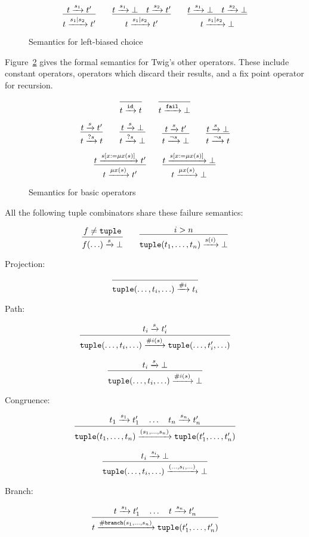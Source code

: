 \begin{figure}[h]
\label{semantics:choice}
\[
\infer{t \arr{s_1|s_2} t'}{t \arr{s_1} t'}
\qquad 
\infer{t \arr{s_1|s_2} t'}{t \arr{s_1} \bot \quad t \arr{s_2} t'}
\qquad
\infer{t \arr{s_1|s_2} \bot}{t \arr{s_1} \bot \quad t \arr{s_2} \bot}
\]
\caption{Semantics for left-biased choice}
\end{figure}

Figure~\ref{semantics:basic} gives the formal semantics for Twig's other
operators. These include constant operators, operators which discard their
results, and a fix point operator for recursion.

\begin{figure}[h]
\label{semantics:basic}
\[
\infer{t \arr{\mathtt{id}} t}{}
\qquad
\infer{t \arr{\mathtt{fail}} \bot}{}
\]

\[
\infer{t \arr{?s} t}{t \arr{s} t'}
\qquad 
\infer{t \arr{?s} \bot}{t \arr{s} \bot}
\qquad
\infer{t \arr{\lnot s} \bot}{t \arr{s} t'}
\qquad 
\infer{t \arr{\lnot s} t}{t \arr{s} \bot}
\]

\[
\infer{t \arr{\mu x(s)} t'}{t \arr{s[x := \mu x(s)]} t'}
\qquad 
\infer{t \arr{\mu x(s)} \bot}{t \arr{s[x := \mu x(s)]} \bot}
\]
\caption{Semantics for basic operators}
\end{figure}

All the following tuple combinators share these failure semantics:

\[
\infer{f(\ldots) \arr{s} \bot}
{f \neq \mathtt{tuple}}
\qquad
\infer{\mathtt{tuple}(t_1,\ldots,t_n) \arr{s(i)} \bot}{i > n}
\]

Projection:

\[
\infer{\mathtt{tuple}(\ldots,t_i,\ldots) \arr{\#i} t_i}{}
\]

Path:

\[
\infer{\mathtt{tuple}(\ldots,t_i,\ldots) \arr{\#i(s)} 
\mathtt{tuple}(\ldots,t_i',\ldots)}
{t_i \arr{s} t_i'}
\]

\[
\infer{\mathtt{tuple}(\ldots,t_i,\ldots) \arr{\#i(s)} \bot}
{t_i \arr{s} \bot}
\]

Congruence:

\[
\infer{
\mathtt{tuple}(t_1,\ldots,t_n)
\arr{(s_1,\ldots,s_n)}
\mathtt{tuple}(t_1',\ldots,t_n') }
{t_1 \arr{s_1} t_1' \quad \ldots \quad t_n \arr{s_n} t_n'}
\]

\[
\infer{
\mathtt{tuple}(\ldots,t_i,\ldots)
\arr{(\ldots,s_i,\ldots)}
\bot}
{t_i \arr{s_i} \bot}
\]

Branch:

\[
\infer{
  t \arr{\mathtt{\#branch}(s_1,\ldots,s_n)}
  \mathtt{tuple}(t_1',\ldots,t_n')
}{t \arr{s_1} t_1' \quad \ldots \quad t \arr{s_n} t_n'}
\]

